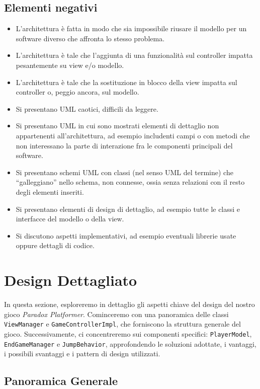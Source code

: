 \documentclass[a4paper,12pt]{report}
\begin{document}
	\subsection*{Elementi negativi}
	\begin{itemize}
		\item L'architettura è fatta in modo che sia impossibile riusare il modello per un software diverso che affronta lo stesso problema.
		\item L'architettura è tale che l'aggiunta di una funzionalità sul controller impatta pesantemente su view e/o modello.
		\item L'architettura è tale che la sostituzione in blocco della view impatta sul controller o, peggio ancora, sul modello.
		\item Si presentano UML caotici, difficili da leggere.
		\item Si presentano UML in cui sono mostrati elementi di dettaglio non appartenenti all'architettura, ad esempio includenti campi o con metodi che non interessano la parte di interazione fra le componenti principali del software.
		\item Si presentano schemi UML con classi (nel senso UML del termine) che ``galleggiano'' nello schema, non connesse, ossia senza relazioni con il resto degli elementi inseriti.
		\item Si presentano elementi di design di dettaglio, ad esempio tutte le classi e interfacce del modello o della view.
		\item Si discutono aspetti implementativi, ad esempio eventuali librerie usate oppure dettagli di codice.
	\end{itemize}
	
	\section{Design Dettagliato}
	
	In questa sezione, esploreremo in dettaglio gli aspetti chiave del design del nostro gioco \textit{Paradox Platformer}. Cominceremo con una panoramica delle classi \texttt{ViewManager} e \texttt{GameControllerImpl}, che forniscono la struttura generale del gioco. Successivamente, ci concentreremo sui componenti specifici: \texttt{PlayerModel}, \texttt{EndGameManager} e \texttt{JumpBehavior}, approfondendo le soluzioni adottate, i vantaggi, i possibili svantaggi e i pattern di design utilizzati.
	
	\subsection{Panoramica Generale}
	
\end{document}
